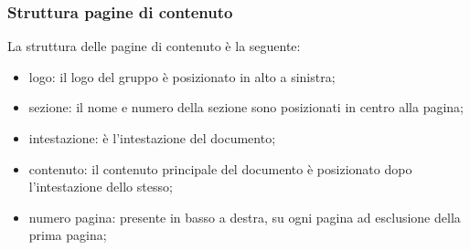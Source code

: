 \subsubsection{Struttura pagine di contenuto}
La struttura delle pagine di contenuto è la seguente:
\begin{itemize}
	\item logo: il logo del gruppo è posizionato in alto a sinistra;
	\item sezione: il nome e numero della sezione sono posizionati in centro alla pagina;
	\item intestazione: è l’intestazione del documento;
	\item contenuto: il contenuto principale del documento è posizionato dopo l’intestazione dello stesso;
	\item numero pagina: presente in basso a destra, su ogni pagina ad esclusione della prima pagina;
\end{itemize}




